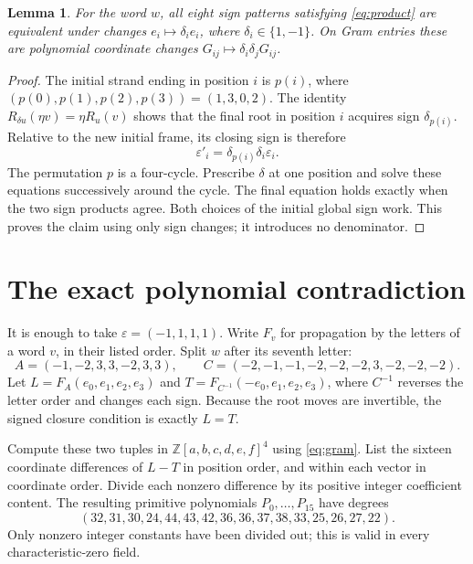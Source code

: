 \documentclass[11pt]{article}
\newtheorem{lemma}[theorem]{Lemma}
\begin{document}
\begin{lemma}\label{lem:sign-gauge}
For the word $w$, all eight sign patterns satisfying
\eqref{eq:product} are equivalent under changes
$e_i\mapsto\delta_i e_i$, where $\delta_i\in\{1,-1\}$.
On Gram entries these are polynomial coordinate changes
$G_{ij}\mapsto\delta_i\delta_jG_{ij}$.
\end{lemma}
\begin{proof}
The initial strand ending in position $i$ is
$p(i)$, where $(p(0),p(1),p(2),p(3))=(1,3,0,2)$.
The identity
$R_{\delta u}(\eta v)=\eta R_u(v)$
shows that the final root in position $i$ acquires sign $\delta_{p(i)}$.
Relative to the new initial frame, its closing sign is therefore
\[
                \varepsilon'_i
                    =\delta_{p(i)}\delta_i\varepsilon_i .
\]
The permutation $p$ is a four-cycle. Prescribe $\delta$ at one position
and solve these equations successively around the cycle. The final
equation holds exactly when the two sign products agree. Both choices
of the initial global sign work. This proves the claim using only
sign changes; it introduces no denominator.
\end{proof}

\section{The exact polynomial contradiction}
It is enough to take
$\varepsilon=(-1,1,1,1)$.
Write $F_v$ for propagation by the letters of a word $v$, in their
listed order. Split $w$ after its seventh letter:
\[
 A=(-1,-2,3,3,-2,3,3),\qquad
 C=(-2,-1,-1,-2,-2,-2,3,-2,-2,-2).
\]
Let $L=F_A(e_0,e_1,e_2,e_3)$ and
$T=F_{C^{-1}}(-e_0,e_1,e_2,e_3)$, where $C^{-1}$ reverses the
letter order and changes each sign. Because the root moves are
invertible, the signed closure condition is exactly $L=T$.

Compute these two tuples in
$\mathbb Z[a,b,c,d,e,f]^4$ using \eqref{eq:gram}.
List the sixteen coordinate differences of $L-T$ in position order,
and within each vector in coordinate order. Divide each nonzero
difference by its positive integer coefficient content.
The resulting primitive polynomials $P_0,\ldots,P_{15}$ have degrees
\[
 (32,31,30,24,44,43,42,36,36,37,38,33,25,26,27,22).
\]
Only nonzero integer constants have been divided out; this is valid
in every characteristic-zero field.
\end{document}
